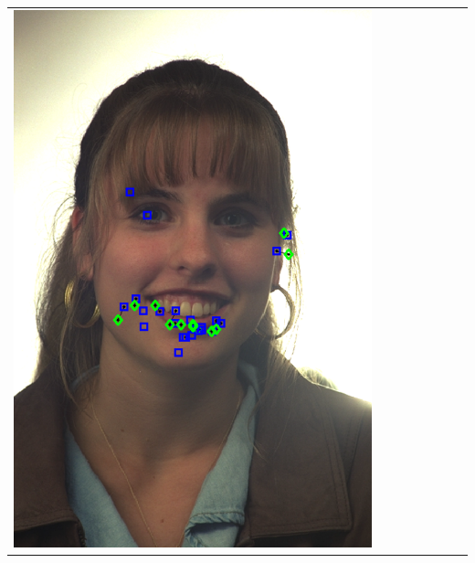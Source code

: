 \documentclass[landscape,final,a0paper,fontscale=0.27065]{baposter}
\begin{document}
\begin{poster}
{{\begin{tabular}{@{}rccccccc@{}}
 \parbox[c]{0.11\linewidth}{\includegraphics[width=\linewidth]{images/l_fb_fail.pdf}} &

\end{tabular}}}
\end{poster}
\end{document}
